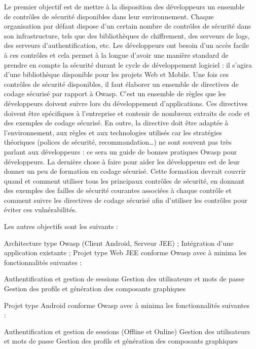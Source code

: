 \begin{itemize}
	\itemcheck Le premier objectif est de mettre à la disposition des développeurs un ensemble de contrôles de sécurité disponibles dans leur environnement. Chaque organisation par défaut dispose d’un certain nombre de contrôles de sécurité dans son infrastructure, tels que des bibliothèques de chiffrement, des serveurs de logs, des serveurs d'authentification, etc. Les développeurs ont besoin d'un accès facile à ces contrôles et cela permet à la longue d’avoir une manière standard de prendre en compte la sécurité durant le cycle de développement logiciel : il s'agira d'une bibliothèque disponible pour les projets Web et Mobile.
	\itemcheck Une fois ces contrôles de sécurité disponibles, il faut élaborer un ensemble de directives de codage sécurisé par rapport à Owasp. C'est un ensemble de règles que les développeurs doivent suivre lors du développement d'applications. Ces directives doivent être spécifiques à l’entreprise et contenir de nombreux extraits de code et des exemples de codage sécurisé. En outre, la directive doit être adaptée à l’environnement, aux règles et aux technologies utilisés car les stratégies théoriques (polices de sécurité, recommandation…) ne sont souvent pas très parlant aux développeurs : ce sera un guide de bonnes pratiques Owasp pour développeurs.
	\itemcheck La dernière chose à faire pour aider les développeurs est de leur donner un peu de formation en codage sécurisé. Cette formation devrait couvrir quand et comment utiliser tous les principaux contrôles de sécurité, en donnant des exemples des failles de sécurité courantes associées à chaque contrôle et comment suivre les directives de codage sécurisé afin d'utiliser les contrôles pour éviter ces vulnérabilités.
\end{itemize}
Les autres objectifs sont les suivants :
\begin{itemize}
	\itemcheck Architecture type Owasp (Client Android, Serveur JEE) ;
	\itemcheck Intégration d'une application existante ;
	\itemcheck Projet type Web JEE conforme Owasp avec à minima les fonctionnalités suivantes :
	\begin{itemize}
		\itemtirait Authentification et gestion de sessions
		\itemtirait Gestion des utilisateurs et mots de passe
		\itemtirait Gestion des profils et génération des composants graphiques
	\end{itemize}
	\itemcheck Projet type Android conforme Owasp avec à minima les fonctionnalités suivantes :
	\begin{itemize}	
		\itemtirait Authentification et gestion de sessions (Offline et Online)
		\itemtirait Gestion des utilisateurs et mots de passe
		\itemtirait Gestion des profils et génération des composants graphiques
	\end{itemize}
\end{itemize}
